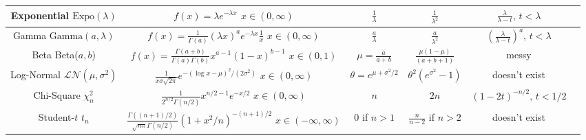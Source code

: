 \documentclass[10pt,landscape]{article}
\newcommand{\Beta}{\textrm{Beta}}
\newcommand{\Gam}{\textrm{Gamma}}
\newcommand{\Expo}{\textrm{Expo}}
\begin{document}
\begin{center}
\begin{tabular}{cccccc}
\hline
\shortstack{Exponential \\ $\Expo(\lambda)$} & \shortstack{$f(x) = \lambda e^{-\lambda x}$\\$ x \in (0, \infty)$} & $\frac{1}{\lambda}$  & $\frac{1}{\lambda^2}$ & $\frac{\lambda}{\lambda - t}, \, t < \lambda$\\
\hline
\shortstack{Gamma \\ $\Gam(a, \lambda)$} & \shortstack{$f(x) = \frac{1}{\Gamma(a)}(\lambda x)^ae^{-\lambda x}\frac{1}{x}$\\$ x \in (0, \infty)$} & $\frac{a}{\lambda}$  & $\frac{a}{\lambda^2}$ & $\left(\frac{\lambda}{\lambda - t}\right)^a, \, t < \lambda$\\
\hline
\shortstack{Beta \\ \Beta($a, b$)} & \shortstack{$f(x) = \frac{\Gamma(a+b)}{\Gamma(a)\Gamma(b)}x^{a-1}(1-x)^{b-1}$\\$x \in (0, 1) $} & $\mu = \frac{a}{a + b}$  & $\frac{\mu(1-\mu)}{(a + b + 1)}$ & messy \\
\hline
\shortstack{Log-Normal \\ $\mathcal{LN}(\mu,\sigma^2)$} & \shortstack{$\frac{1}{x\sigma \sqrt{2\pi}}e^{-(\log x - \mu)^2/(2\sigma^2)}$\\$x \in (0, \infty)$} & $\theta = e^{ \mu + \sigma^2/2}$ & $\theta^2 (e^{\sigma^2} - 1)$ & doesn't exist\\
\hline
\shortstack{Chi-Square \\ $\chi_n^2$} & \shortstack{$\frac{1}{2^{n/2}\Gamma(n/2)}x^{n/2 - 1}e^{-x/2}$\\$x \in (0, \infty) $} & $n$  & $2n$ & $(1 - 2t)^{-n/2}, \, t < 1/2$\\
\hline
\shortstack{Student-$t$ \\ $t_n$} & \shortstack{$\frac{\Gamma((n+1)/2)}{\sqrt{n\pi} \Gamma(n/2)} (1+x^2/n)^{-(n+1)/2}$\\$x \in (-\infty, \infty)$} & $0$ if $n>1$ & $\frac{n}{n-2}$ if $n>2$ & doesn't exist\\
\hline
\end{tabular}
\end{center}
\end{document}
